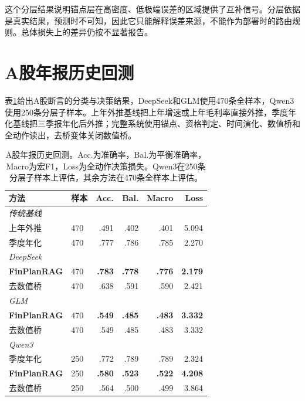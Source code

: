 这个分层结果说明锚点层在高密度、低极端误差的区域提供了互补信号。分层依据是真实结果，预测时不可知，因此它只能解释误差来源，不能作为部署时的路由规则。总体损失上的差异仍按不显著报告。

\section{A股年报历史回测}
\label{sec:ashare}

表\ref{tab:ashare}给出A股断言的分类与决策结果，DeepSeek和GLM使用470条全样本，Qwen3使用250条分层子样本。上年外推基线把上年增速或上年毛利率直接外推，季度年化基线把三季报年化后外推；完整系统使用锚点、资格判定、时间演化、数值桥和全动作读出，去桥变体关闭数值桥。

\begin{table}[htbp]
\centering
{}
\setlength{\tabcolsep}{4pt}
\caption{A股年报历史回测。Acc.为准确率，Bal.为平衡准确率，Macro为宏F1，Loss为全动作决策损失。Qwen3在250条分层子样本上评估，其余方法在470条全样本上评估。}
\label{tab:ashare}
\begin{tabular}{llrrrr}
\toprule
方法 & 样本 & Acc. & Bal. & Macro & Loss \\
\midrule
\multicolumn{6}{l}{\textit{传统基线}} \\
上年外推 & 470 & .491 & .402 & .401 & 5.094 \\
季度年化 & 470 & .777 & .786 & .785 & 2.270 \\
\midrule
\multicolumn{6}{l}{\textit{DeepSeek}} \\
\textbf{FinPlanRAG} & 470 & \textbf{.783} & \textbf{.778} & \textbf{.776} & \textbf{2.179} \\
去数值桥 & 470 & .638 & .591 & .590 & 2.421 \\
\midrule
\multicolumn{6}{l}{\textit{GLM}} \\
\textbf{FinPlanRAG} & 470 & \textbf{.549} & \textbf{.485} & \textbf{.483} & \textbf{3.332} \\
去数值桥 & 470 & .549 & .485 & .483 & 3.332 \\
\midrule
\multicolumn{6}{l}{\textit{Qwen3}} \\
季度年化 & 250 & .772 & .789 & .789 & 2.324 \\
\textbf{FinPlanRAG} & 250 & \textbf{.580} & \textbf{.523} & \textbf{.522} & \textbf{4.208} \\
去数值桥 & 250 & .564 & .500 & .499 & 3.864 \\
\bottomrule
\end{tabular}
\end{table}

